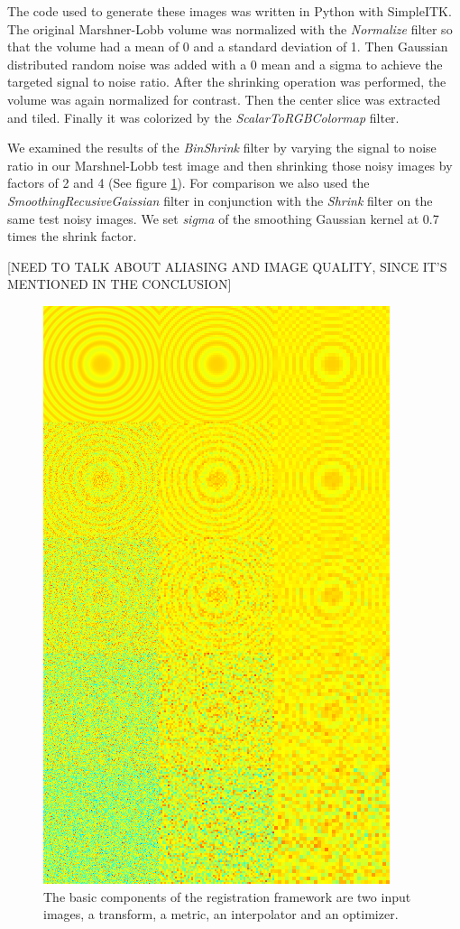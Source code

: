 \documentclass{InsightArticle}
\begin{document}
The code used to generate these images was written in Python with
SimpleITK. The original Marshner-Lobb volume was normalized with the 
\textit{Normalize} filter so that the volume had a mean
of 0 and a standard deviation of 1. Then Gaussian distributed random
noise was added with a 0 mean and a sigma to achieve the targeted
signal to noise ratio. After the shrinking operation was performed,
the volume was again normalized for contrast. Then the center slice
was extracted and tiled. Finally it was colorized by the
\textit{ScalarToRGBColormap} filter\cite{Tustison2009}.

We examined the results of the \textit{BinShrink} filter by varying the
signal to noise ratio in our Marshnel-Lobb test image and then shrinking those noisy
images by factors of 2 and 4 (See figure
\ref{fig:BinShrinkComparison}). For comparison we also used the
\textit{SmoothingRecusiveGaissian} filter in conjunction with the
\textit{Shrink} filter on the same test noisy images.  We set \textit{sigma} of the
smoothing Gaussian kernel at 0.7 times the shrink factor. 

[NEED TO TALK ABOUT ALIASING AND IMAGE QUALITY, SINCE IT'S MENTIONED IN THE CONCLUSION]

\begin{figure}
  \centering
  \includegraphics[width=0.4\linewidth]{images/binshrink_hot.png}
  \caption[Registration Framework Components]{The basic components of the
    registration framework are two input images, a transform, a metric, an
    interpolator and an optimizer.}
  \label{fig:BinShrinkComparison}
\end{figure}
\end{document}
